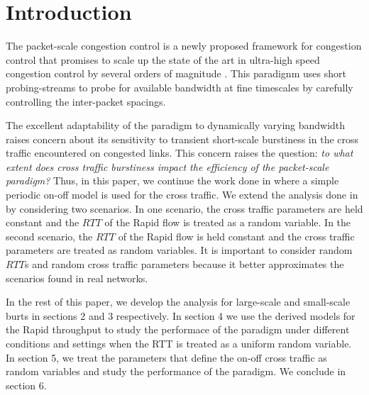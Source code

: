 \section{Introduction}
  The packet-scale congestion control is a newly proposed framework for 
  congestion control that promises to scale up the state of the art in 
  ultra-high speed congestion control by several orders of magnitude 
  \cite{Konda-infocom09}. This paradignm uses short probing-streams to probe 
  for available bandwidth at fine timescales by carefully controlling the 
  inter-packet spacings.

  The excellent adaptability of the paradigm to dynamically varying 
  bandwidth raises concern about its sensitivity to transient short-scale 
  burstiness in the cross traffic encountered on congested links. This concern 
  raises the question: \emph{to what extent does cross traffic burstiness 
  impact the efficiency of the packet-scale paradigm?} Thus, in 
  this paper, we continue the work done in \cite{Lovewell2011-Noise-TR} where 
  a simple periodic on-off model is used for the cross traffic. We extend the 
  analysis done in \cite{Lovewell2011-Noise-TR} by considering two scenarios.
  In one scenario, the cross traffic parameters are held constant and the 
  $RTT$ 
  of the Rapid flow is treated as a random variable. In the second 
  scenario, the $RTT$ of the Rapid flow is held constant and the cross traffic 
  parameters are treated as random variables. 
  It is important to consider random $RTT$s and random cross traffic parameters 
  because it better approximates the scenarios found in real networks.

  In the rest of this paper, we develop the analysis for large-scale and 
  small-scale burts in sections 2 and 3 respectively. In section 4 we use 
  the derived models for the Rapid throughput to study the performace of 
  the paradigm under different conditions and settings when the RTT is treated 
  as a uniform random variable. In section 5, we treat the parameters that 
  define the on-off cross traffic as random variables and study the 
  performance of the paradigm. We conclude in section 6.
